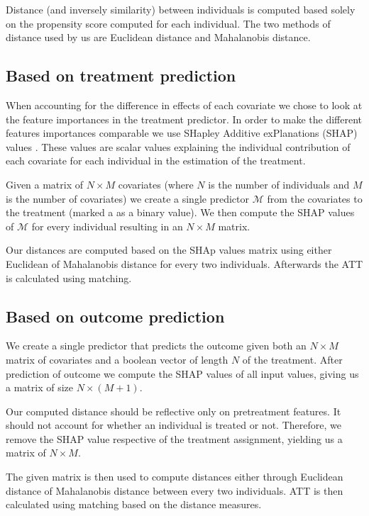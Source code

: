 \documentclass{article}
\begin{document}
Distance (and inversely similarity) between individuals is computed based solely on the propensity score computed for each individual. The two methods of distance used by us are Euclidean distance and Mahalanobis distance.


\subsection{Based on treatment prediction}
When accounting for the difference in effects of each covariate we chose to look at the feature importances in the treatment predictor. In order to make the different features importances comparable we use SHapley Additive exPlanations (SHAP) values \cite{lundberg2017unified}. These values are scalar values explaining the individual contribution of each covariate for each individual in the estimation of the treatment. 

Given a matrix of $N\times{}M$ covariates (where $N$ is the number of individuals and $M$ is the number of covariates) we create a single predictor $\mathcal{M}$ from the covariates to the treatment (marked a as a binary value). We then compute the SHAP values of $\mathcal{M}$ for every individual resulting in an $N\times{}M$ matrix. 

Our distances are computed based on the SHAp values matrix using either Euclidean of Mahalanobis distance for every two individuals. Afterwards the ATT is calculated using matching. 

\subsection{Based on outcome prediction}
We create a single predictor that predicts the outcome given both an $N\times{}M$ matrix of covariates and a boolean vector of length $N$ of the treatment. After prediction of outcome we compute the SHAP values of all input values, giving us a matrix of size $N\times{}(M+1)$. 

Our computed distance should be reflective only on pretreatment features. It should not account for whether an individual is treated or not. Therefore, we remove the SHAP value respective of the treatment assignment, yielding us a matrix of $N\times{}M$. 

The given matrix is then used to compute distances either through Euclidean distance of Mahalanobis distance between every two individuals. ATT is then calculated using matching based on the distance measures. 
\end{document}
